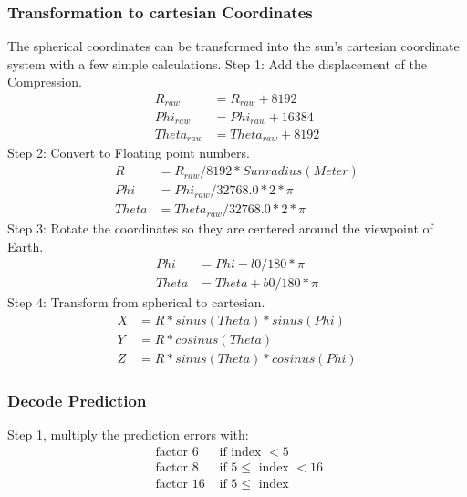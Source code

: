 \subsubsection{Transformation to cartesian Coordinates} \label{anhang:format:euler}
The spherical coordinates can be transformed into the sun's cartesian coordinate system with a few simple calculations.
Step 1: Add the displacement of the Compression. 
\begin{equation}
\begin{split}
	R_{raw} &= R_{raw} + 8192\\
	Phi_{raw} &= Phi_{raw} + 16384\\
	Theta_{raw} &= Theta_{raw} + 8192
\end{split}
\end{equation}
Step 2: Convert to Floating point numbers.
\begin{equation}
\begin{split}
	R &= R_{raw} / 8192 * Sunradius (Meter)\\
	Phi &= Phi_{raw} / 32768.0 * 2 *\pi\\
	Theta &= Theta_{raw} /32768.0 * 2 *\pi
	\end{split}
\end{equation}
Step 3: Rotate the coordinates so they are centered around the viewpoint of Earth.
\begin{equation}
\begin{split}
	Phi &= Phi - l0 /180 * \pi\\
	Theta &= Theta + b0 /180 * \pi
	\end{split}
\end{equation}
Step 4: Transform from spherical to cartesian.
\begin{equation}
\begin{split}
	X &= R * sinus(Theta) * sinus(Phi)\\
	Y &= R * cosinus(Theta)\\
	Z &= R * sinus(Theta) * cosinus(Phi)
	\end{split}
\end{equation}

\subsubsection{Decode Prediction}\label{anhang:format:prediction}
Step 1, multiply the prediction errors with:
\begin{equation}
\begin{split}
	\mbox{ factor }6 & \mbox{ if index } < 5\\
	\mbox{ factor }8 & \mbox{ if } 5 \leq \mbox{ index } < 16\\
	\mbox{ factor }16 & \mbox{ if } 5 \leq \mbox{ index }
\end{split}
\end{equation}

